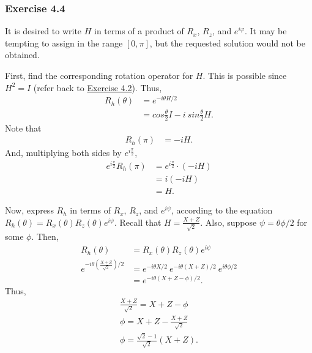 
\subsubsection{Exercise 4.4}

It is desired to write $H$ in terms of a product of $R_x$, $R_z$, and $e^{i\varphi}$.
It may be tempting to assign in the range $[0, \pi]$,
but the requested solution would not be obtained.

First, find the corresponding rotation operator for $H$.
This is possible since $H^2 = I$
(refer back to \hyperref[nielsen-and-chuang-exercise-4-2]{Exercise 4.2}).
Thus,
\begin{align}
    R_h(\theta) &= e^{-i \theta H / 2} \\
    &= cos \frac\theta2 I - i\ sin \frac\theta2 H.
\end{align}
Note that
\begin{align}
    R_h(\pi) &= -i H.
\end{align}
And, multiplying both sides by $e^{i \frac \pi 2}$,
\begin{align}
    \label{eq:nielsen-and-chuang-exercise-4-4-e-rh}
    e^{i \frac \pi 2} R_h(\pi) &= e^{i \frac \pi 2} \cdot (-i H) \\
    &= i (-i H) \\
    \label{eq:nielsen-and-chuang-exercise-4-4-h}
    &= H.
\end{align}

Now, express $R_h$ in terms of $R_x$, $R_z$, and $e^{i\psi}$,
according to the equation $R_h(\theta) = R_x(\theta) R_z(\theta) e^{i\psi}$.
Recall that $H = \frac{X + Z}{\sqrt 2}$.
Also, suppose $\psi = \theta \phi / 2$ for some $\phi$.
Then,
\begin{align}
    R_h(\theta) &= R_x(\theta) R_z(\theta) e^{i\psi} \\
    e^{-i \theta (\frac{X + Z}{\sqrt 2}) / 2} &=
        e^{-i \theta X / 2}\ e^{-i \theta (X + Z) / 2}\ e^{i \theta \phi / 2} \\
    &= e^{-i \theta (X + Z - \phi) / 2}.
\end{align}
Thus,
\begin{align}
    \frac{X + Z}{\sqrt 2} = X + Z - \phi \\
    \phi = X + Z - \frac{X + Z}{\sqrt 2} \\
    \phi = \frac{\sqrt2 - 1}{\sqrt 2} (X + Z).
\end{align}

